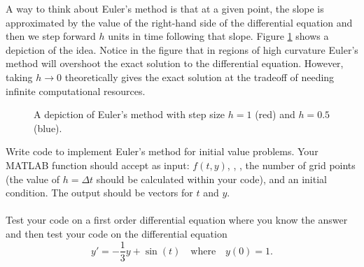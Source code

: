 A way to think about Euler's method is that at a given point, the slope is approximated by
the value of the right-hand side of the differential equation and then we step forward $h$
units in time following that slope.  Figure \ref{fig:Euler} shows a depiction of the idea.
Notice in the figure that in regions of high curvature Euler's method will overshoot the
exact solution to the differential equation.  However, taking $h \to 0$ theoretically
gives the exact solution at the tradeoff of needing infinite computational resources.

\begin{figure}[ht!]
    \begin{center}
    \end{center}
    \caption{A depiction of Euler's method with step size $h=1$ (red) and $h=0.5$ (blue).}
    \label{fig:Euler}
\end{figure}


\begin{problem}
    Write code to implement Euler's method for initial value problems.  Your MATLAB
    function should accept as input: $f(t,y)$, , , the number of
    grid points (the value of $h = \Delta t$ should be calculated within your code), and
    an initial condition.  The output should be vectors for $t$ and $y$.\\
     \\
    Test your code on a first order differential equation where you know the answer and
    then test your code on the differential equation
    \[ y' = -\frac{1}{3}y+\sin(t) \quad \text{where} \quad y(0) = 1. \]
\end{problem}


